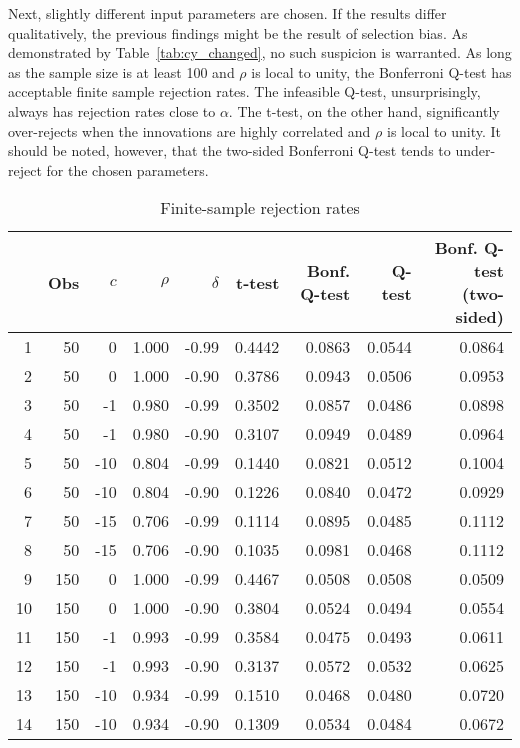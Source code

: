 \documentclass{article}
\begin{document}
Next, slightly different input parameters are chosen. If the results differ qualitatively, the previous findings might be the result of selection bias. As demonstrated by Table~\vref{tab:cy_changed}, no such suspicion is warranted. As long as the sample size is at least 100 and $\rho$ is local to unity, the Bonferroni Q-test has acceptable finite sample rejection rates. The infeasible Q-test, unsurprisingly, always has rejection rates close to $\alpha$. The t-test, on the other hand, significantly over-rejects when the innovations are highly correlated and $\rho$ is local to unity. It should be noted, however, that the two-sided Bonferroni Q-test tends to under-reject for the chosen parameters. 
\begin{table}[h!]
\caption{Finite-sample rejection rates}
\centering
\label{tab:cy_changed}
\begin{threeparttable}
\begin{tabular}{rrrrrrrrr}
  \hline
 & Obs & $c$ & $\rho$ & $\delta$ & t-test & Bonf. Q-test & Q-test & Bonf. Q-test (two-sided) \\ 
  \hline
1 & 50 & 0 & 1.000 & -0.99 & 0.4442 & 0.0863 & 0.0544 & 0.0864 \\ 
  2 & 50 & 0 & 1.000 & -0.90 & 0.3786 & 0.0943 & 0.0506 & 0.0953 \\ 
  3 & 50 & -1 & 0.980 & -0.99 & 0.3502 & 0.0857 & 0.0486 & 0.0898 \\ 
  4 & 50 & -1 & 0.980 & -0.90 & 0.3107 & 0.0949 & 0.0489 & 0.0964 \\ 
  5 & 50 & -10 & 0.804 & -0.99 & 0.1440 & 0.0821 & 0.0512 & 0.1004 \\ 
  6 & 50 & -10 & 0.804 & -0.90 & 0.1226 & 0.0840 & 0.0472 & 0.0929 \\ 
  7 & 50 & -15 & 0.706 & -0.99 & 0.1114 & 0.0895 & 0.0485 & 0.1112 \\ 
  8 & 50 & -15 & 0.706 & -0.90 & 0.1035 & 0.0981 & 0.0468 & 0.1112 \\ 
  9 & 150 & 0 & 1.000 & -0.99 & 0.4467 & 0.0508 & 0.0508 & 0.0509 \\ 
  10 & 150 & 0 & 1.000 & -0.90 & 0.3804 & 0.0524 & 0.0494 & 0.0554 \\ 
  11 & 150 & -1 & 0.993 & -0.99 & 0.3584 & 0.0475 & 0.0493 & 0.0611 \\ 
  12 & 150 & -1 & 0.993 & -0.90 & 0.3137 & 0.0572 & 0.0532 & 0.0625 \\ 
  13 & 150 & -10 & 0.934 & -0.99 & 0.1510 & 0.0468 & 0.0480 & 0.0720 \\ 
  14 & 150 & -10 & 0.934 & -0.90 & 0.1309 & 0.0534 & 0.0484 & 0.0672 \\ 

\end{tabular}
\end{threeparttable}
\end{table}
\end{document}
